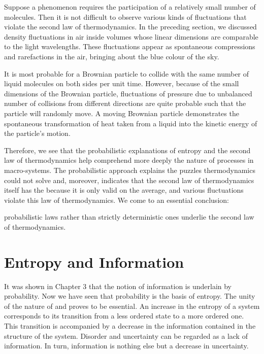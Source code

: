 Suppose a phenomenon requires the participation of a relatively small number of molecules. Then it is not difficult to observe various kinds of fluctuations that violate the second law of thermodynamics. In the preceding section, we discussed density fluctuations in air inside volumes
whose linear dimensions are comparable to the light wavelengths. These fluctuations appear as spontaneous compressions and rarefactions in the air, bringing about the blue colour of the sky.

It is most probable for a Brownian particle to collide with the same number of liquid molecules on both sides per unit time. However, because of the small dimensions of the Brownian particle, fluctuations of pressure due to unbalanced number of collisions from different directions are quite probable such that the particle will randomly move. A moving Brownian	particle demonstrates the	spontaneous transformation of heat taken from a liquid into the kinetic energy of the particle's motion.

Therefore, we see that the probabilistic explanations of entropy and the second law of thermodynamics help comprehend more deeply the nature of processes in macro-systems. The probabilistic approach explains the puzzles thermodynamics could not solve and, moreover, indicates that the second law of thermodynamics itself has the  because it is only valid on the average, and various fluctuations violate this law of thermodynamics. We come to an essential conclusion: 
\begin{mybox}{}
probabilistic laws rather than strictly deterministic ones underlie the second law of thermodynamics.
\end{mybox}



\section{Entropy and Information }

 It was shown in Chapter 3 that the notion of information is underlain by probability. Now we have seen that probability is the basis of entropy. The unity of the nature of  and  proves to be essential. An increase in the entropy of a system corresponds to its transition from a less ordered state to a more ordered one. This transition is accompanied by a decrease in the information contained in the structure of the system. Disorder and uncertainty can be regarded as a lack of information. In turn, information is nothing else but a decrease in uncertainty.


